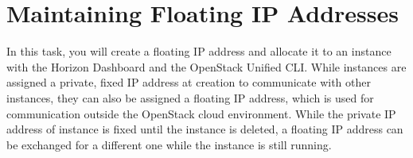 \documentclass[letterpaper, 12pt]{article}
\begin{document}
\section{Maintaining Floating IP Addresses}\label{sec:maintaining_floating_ip_addresses}
In this task, you will create a floating IP address and allocate it to an instance with the Horizon Dashboard and the OpenStack Unified CLI.
While instances are assigned a private, fixed IP address at creation to communicate with other instances, they can also be assigned a floating IP address, which is used for communication outside the OpenStack cloud environment.
While the private IP address of instance is fixed until the instance is deleted, a floating IP address can be exchanged for a different one while the instance is still running.
\end{document}
